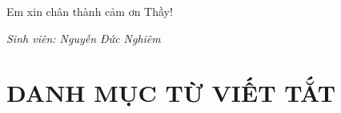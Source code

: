 \documentclass[12pt,a4paper,oneside]{report}
\begin{document}
Em xin chân thành cảm ơn Thầy!

\vspace{1.5cm}
\begin{flushright}
    \textit{Sinh viên: Nguyễn Đức Nghiêm}
\end{flushright}

\newpage
\tableofcontents

\newpage
\listoffigures
{}

\newpage
\listoftables
{}

\newpage
\chapter*{DANH MỤC TỪ VIẾT TẮT}
\end{document}
